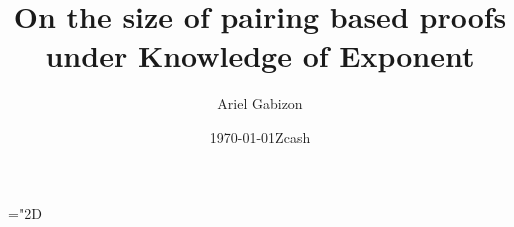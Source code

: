 \documentclass[11pt]{article}
\title{%
On the size of pairing based proofs under Knowledge of Exponent}
\date{\today}
\author{Ariel Gabizon}
\date{Zcash}
\numberwithin{figure}{section} %
\newcommand{\set}[1]{\ensuremath{\left\{#1\right\}}\xspace}
\begin{document}
\maketitle
 \mathchardef\mhyphen="2D

\newcommand{\G}{\ensuremath{{\mathbb G}}\xspace}
\newcommand{\Gstar}{\ensuremath{{\mathbb G}^*}\xspace}

\newcommand{\grouppair}{\ensuremath{G^*}\xspace}

\newcommand{\Gt}{\ensuremath{{\mathbb G}_t}\xspace}
\newcommand{\F}{\ensuremath{\mathbb F}\xspace}
\newcommand{\Fstar}{\ensuremath{\mathbb F^*}\xspace}

\newcommand{\help}[1]{$#1$-helper\xspace}
\newcommand{\randompair}[1]{\ensuremath{\mathsf{randomPair}(#1)}\xspace}
\newcommand{\pair}[1]{$#1$-pair\xspace}
\newcommand{\pairs}[1]{$#1$-pairs\xspace}

\newcommand{\pairone}[1]{\G1-$#1$-pair\xspace}
\newcommand{\pairtwo}[1]{\G2-$#1$-pair\xspace}
\newcommand{\sameratio}[2]{\ensuremath{\mathsf{SameRatio}(#1,#2)}\xspace}
\newcommand{\vecc}[2]{\ensuremath{(#1)_{#2}}\xspace}
\newcommand{\players}{\ensuremath{[n]}\xspace}
\newcommand{\adv}{\ensuremath{A}\xspace}
\newcommand{\advprime}{\ensuremath{A'}\xspace}
\newcommand{\extprime}{\ensuremath{E'}\xspace}

\newcommand{\ci}{\ensuremath{\mathrm{CI}}\xspace}
\newcommand{\pairvec}[1]{$#1$-vector\xspace}
\newcommand{\Fq}{\ensuremath{\mathbb{F}_q}\xspace}
\newcommand{\randpair}[1]{\ensuremath{\mathsf{rp}_{#1}}\xspace}
\newcommand{\randpairone}[1]{\ensuremath{\mathsf{rp}_{#1}^{1}}\xspace}

\newcommand{\randpairtwo}[1]{\ensuremath{\mathsf{rp_{#1}^2}}\xspace}%

\newcommand{\rej}{\ensuremath{\mathsf{rej}}\xspace}
\newcommand{\acc}{\ensuremath{\mathsf{acc}}\xspace}
\newcommand{\sha}[1]{\ensuremath{\mathsf{COMMIT}(#1)}\xspace}
 \newcommand{\shaa}{\ensuremath{\mathsf{COMMIT}}\xspace}
 \newcommand{\comm}[1]{\ensuremath{\mathsf{comm}_{#1}}\xspace}
 \newcommand{\defeq}{:=}
\end{document}
